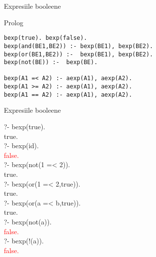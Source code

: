\documentclass[xcolor=x11names,compress,10pt]{beamer}
\begin{document}
\begin{frame}[fragile]{Expresiile booleene}

 \vspace{-5ex}
  
\begin{block}{Prolog}


\begin{verbatim}
bexp(true). bexp(false).
bexp(and(BE1,BE2)) :- bexp(BE1), bexp(BE2).
bexp(or(BE1,BE2)) :-  bexp(BE1), bexp(BE2).
bexp(not(BE)) :-  bexp(BE).

bexp(A1 =< A2) :- aexp(A1), aexp(A2).
bexp(A1 >= A2) :- aexp(A1), aexp(A2).
bexp(A1 == A2) :- aexp(A1), aexp(A2).
\end{verbatim}
\end{block}
\end{frame}

\begin{frame}[fragile]{Expresiile booleene}
\begin{example}
?- bexp(true).\\
true.\\

?- bexp(id).\\
\textcolor{red}{false.}\\


?- bexp(not(1 =< 2)).\\
true.\\

?- bexp(or(1 =< 2,true)).\\
true.\\

?- bexp(or(a =< b,true)).\\
true.\\


?- bexp(not(a)).\\
\textcolor{red}{false.}\\ 
?- bexp(!(a)).\\
\textcolor{red}{false.}
\end{example}
\end{frame}
\end{document}
